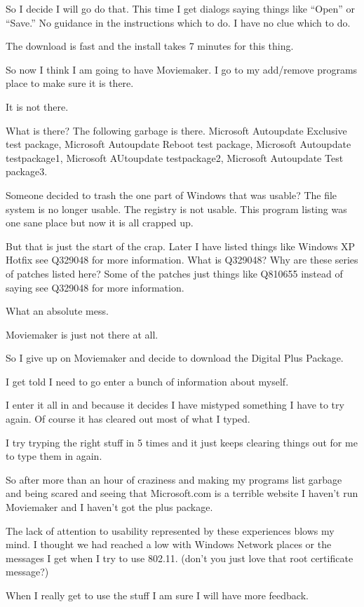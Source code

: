 \documentclass[12pt,letterpaper]{article}
\begin{document}
So I decide I will go do that.
This time I get dialogs saying things like ``Open'' or ``Save.''
No guidance in the instructions which to do.
I have no clue which to do.

The download is fast and the install takes 7 minutes for this thing.

So now I think I am going to have Moviemaker.
I go to my add/remove programs place to make sure it is there.

It is not there.

What is there? The following garbage is there.
Microsoft Autoupdate Exclusive test package, Microsoft Autoupdate Reboot test package,
Microsoft Autoupdate testpackage1, Microsoft AUtoupdate testpackage2,
Microsoft Autoupdate Test package3.

Someone decided to trash the one part of Windows that was usable?
The file system is no longer usable. The registry is not usable.
This program listing was one sane place but now it is all crapped up.

But that is just the start of the crap.
Later I have listed things like Windows XP Hotfix see Q329048 for more information.
What is Q329048? Why are these series of patches listed here?
Some of the patches just things like Q810655 instead of saying see Q329048
for more information.

What an absolute mess.

Moviemaker is just not there at all.

So I give up on Moviemaker and decide to download the Digital Plus Package.

I get told I need to go enter a bunch of information about myself.

I enter it all in and because it decides I have mistyped something I have to try again.
Of course it has cleared out most of what I typed.

I try tryping the right stuff in 5 times and it just keeps clearing things out
for me to type them in again.

So after more than an hour of craziness and making my programs list garbage
and being scared and seeing that Microsoft.com is a terrible website I haven't
run Moviemaker and I haven't got the plus package.

The lack of attention to usability represented by these experiences blows my mind.
I thought we had reached a low with Windows Network places or the messages I
get when I try to use 802.11. (don't you just love that root certificate message?)

When I really get to use the stuff I am sure I will have more feedback.
\end{document}
